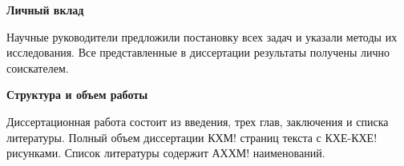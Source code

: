 \textbf{Личный вклад}

Научные руководители предложили постановку всех задач и указали методы их исследования. Все представленные в диссертации результаты получены лично соискателем. 

\textbf{Структура и объем работы}

Диссертационная работа состоит из введения, трех глав, заключения и списка литературы. Полный объем диссертации КХМ! страниц текста с КХЕ-КХЕ! рисунками. Список литературы содержит АХХМ! наименований.

